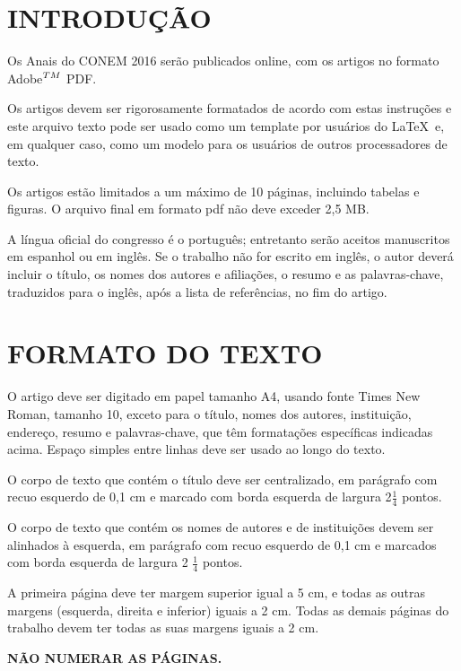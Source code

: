 \documentclass[10pt,fleqn,a4paper]{article}
\begin{document}
    \section{INTRODUÇÃO}
        
        Os Anais do CONEM 2016 serão publicados online,  com os artigos no formato Adobe$^{\small{TM}}$ PDF.

        Os artigos devem ser rigorosamente formatados de acordo com estas instruções e este arquivo texto pode ser usado como um template por usuários do \LaTeX\ e, em qualquer caso, como um modelo para os usuários de outros processadores de texto.

        Os artigos estão limitados a um máximo de 10 páginas, incluindo tabelas e figuras. O arquivo final em formato pdf não deve exceder 2,5 MB.

        A língua oficial do congresso é o português; entretanto serão aceitos manuscritos em espanhol ou em inglês. Se o trabalho não for escrito em inglês, o autor deverá incluir o título, os nomes dos autores e afiliações, o resumo e as palavras-chave, traduzidos para o inglês, após a lista de referências, no fim do artigo.


    \section{FORMATO DO TEXTO}
        
        O artigo deve ser digitado em papel tamanho A4, usando fonte Times New Roman, tamanho 10, exceto para o título, nomes dos autores, instituição, endereço, resumo e palavras-chave, que têm formatações específicas indicadas acima. Espaço simples entre linhas deve ser usado ao longo do texto.

        O corpo de texto que contém o título deve ser centralizado, em parágrafo com recuo esquerdo de 0,1 cm e marcado com borda esquerda de largura 2$\frac{1}{4}$ pontos.

        O corpo de texto que contém os nomes de autores e de instituições devem ser alinhados à esquerda, em parágrafo com recuo esquerdo de 0,1 cm e marcados com borda esquerda de largura 2 $\frac{1}{4}$ pontos.

        A primeira página deve ter margem superior igual a 5 cm, e todas as outras margens (esquerda, direita e inferior) iguais a 2 cm. Todas as demais páginas do trabalho devem ter todas as suas margens iguais a 2 cm.

        \textbf{\textcolor[rgb]{0.98,0.00,0.00}{NÃO NUMERAR AS PÁGINAS.}}
\end{document}
